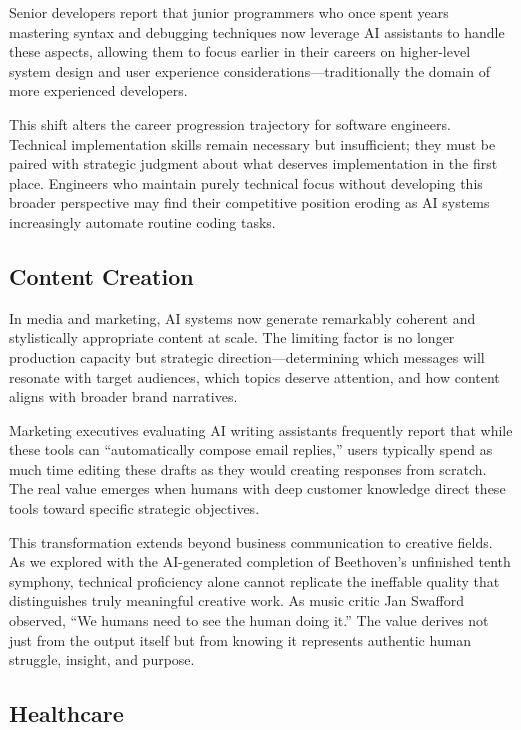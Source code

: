 \documentclass[
  Letterpaper,
]{scrbook}
\begin{document}
Senior developers report that junior programmers who once spent years
mastering syntax and debugging techniques now leverage AI assistants to
handle these aspects, allowing them to focus earlier in their careers on
higher-level system design and user experience
considerations---traditionally the domain of more experienced
developers.

This shift alters the career progression trajectory for software
engineers. Technical implementation skills remain necessary but
insufficient; they must be paired with strategic judgment about what
deserves implementation in the first place. Engineers who maintain
purely technical focus without developing this broader perspective may
find their competitive position eroding as AI systems increasingly
automate routine coding tasks.

\subsection{Content Creation}\label{content-creation}

In media and marketing, AI systems now generate remarkably coherent and
stylistically appropriate content at scale. The limiting factor is no
longer production capacity but strategic direction---determining which
messages will resonate with target audiences, which topics deserve
attention, and how content aligns with broader brand narratives.

Marketing executives evaluating AI writing assistants frequently report
that while these tools can ``automatically compose email replies,''
users typically spend as much time editing these drafts as they would
creating responses from scratch. The real value emerges when humans with
deep customer knowledge direct these tools toward specific strategic
objectives.

This transformation extends beyond business communication to creative
fields. As we explored with the AI-generated completion of Beethoven's
unfinished tenth symphony, technical proficiency alone cannot replicate
the ineffable quality that distinguishes truly meaningful creative work.
As music critic Jan Swafford observed, ``We humans need to see the human
doing it.'' The value derives not just from the output itself but from
knowing it represents authentic human struggle, insight, and purpose.

\subsection{Healthcare}\label{healthcare}
\end{document}
